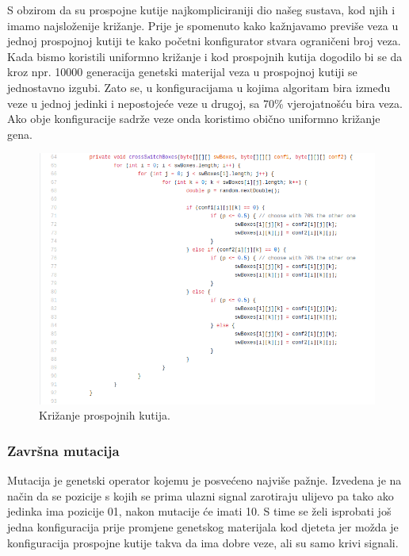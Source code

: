 \documentclass[times, utf8, zavrsni]{fer}
\begin{document}
S obzirom da su prospojne kutije najkompliciraniji dio našeg sustava, kod njih i imamo najsloženije križanje. Prije je spomenuto kako kažnjavamo previše veza u jednoj prospojnoj kutiji te kako početni konfigurator stvara ograničeni broj veza. Kada bismo koristili uniformno križanje i kod prospojnih kutija dogodilo bi se da kroz npr. 10000 generacija genetski materijal veza u prospojnoj kutiji se jednostavno izgubi. Zato se, u konfiguracijama u kojima algoritam bira između veze u jednoj jedinki i nepostojeće veze u drugoj, sa 70\% vjerojatnošću bira veza. Ako obje konfiguracije sadrže veze onda koristimo obično uniformno križanje gena. 

\begin{figure}[H]
	\centering
	\includegraphics[width=18cm]{slike/crossSwBoxes.png}
	\caption{Križanje prospojnih kutija.}
	\label{fig:sw-boxes-crossing}
\end{figure} 

\subsubsection{Završna mutacija}

Mutacija je genetski operator kojemu je posvećeno najviše pažnje. Izvedena je na način da se pozicije s kojih se prima ulazni signal zarotiraju ulijevo pa tako ako jedinka ima pozicije 01, nakon mutacije će imati 10. S time se želi isprobati još jedna konfiguracija prije promjene genetskog materijala kod djeteta jer možda je konfiguracija prospojne kutije takva da ima dobre veze, ali su samo krivi signali.  
\end{document}
